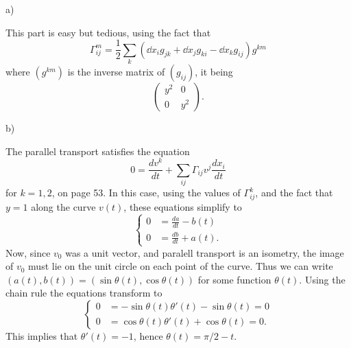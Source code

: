 \documentclass[11pt, english]{article}
\begin{document}
\begin{sol}
a)

This part is easy but tedious, using the fact that
\[
\Gamma^m_{ij} = \frac 12 \sum_k \left( \dd{}{x_i} g_{jk} +\dd{}{x_j} g_{ki} - \dd{}{x_k} g_{ij} \right) g^{km}
\]
where $(g^{km})$ is the inverse matrix of $(g_{ij})$, it being $$
\begin{pmatrix}
y^2 & 0 \\ 0 & y^2 
\end{pmatrix}.$$

b)

The parallel transport satisfies the equation
\[
0 = \frac{dv^k}{dt} + \sum_{ij} \Gamma_{ij} v^j \frac{dx_i}{dt}
\]
for $k=1,2$, on page 53. In this case, using the values of $\Gamma_{ij}^k$, and the fact that $y=1$ along the curve $v(t)$, these equations simplify to
\[
\begin{cases}
  0 &= \frac{da}{dt} - b(t) \\
0 &= \frac{db}{dt} + a(t).
\end{cases}
\]
Now, since $v_0$ was a unit vector, and paralell transport is an isometry, the image of $v_0$ must lie on the unit circle on each point of the curve. Thus we can write $(a(t),b(t)) = (\sin \theta(t), \cos \theta(t))$ for some function $\theta(t)$. Using the chain rule the equations transform to
\[
\begin{cases}
0 &= -\sin \theta(t) \theta'(t)-\sin \theta(t) = 0\\
0 &= \cos \theta(t) \theta'(t) +\cos \theta(t) = 0.
\end{cases}
\]
This implies that $\theta'(t)=-1$, hence $\theta(t)=\pi/2- t$. 
\end{sol}
\end{document}
